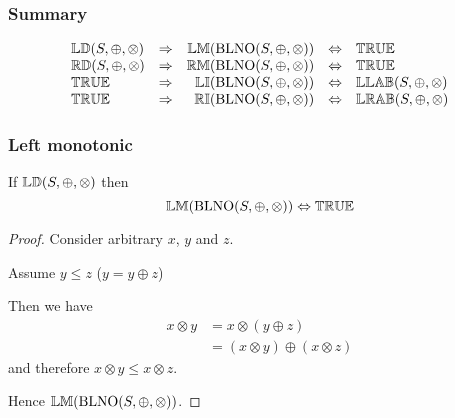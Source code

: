 \documentclass[../Summary.tex]{subfiles}
\begin{document}
\subsubsection{Summary}

\[
\begin{array}{lcrcl} 
\propname{LD}(S, \oplus, \otimes)
	& \Rightarrow
	& \propname{LM}(\mathrm{BLNO}(S,\oplus,\otimes))
    & \Leftrightarrow
    & \propname{TRUE} \\
\propname{RD}(S, \oplus, \otimes)
	& \Rightarrow
	& \propname{RM}(\mathrm{BLNO}(S,\oplus,\otimes))
    & \Leftrightarrow %
    & \propname{TRUE} \\
\propname{TRUE}
	& \Rightarrow
	& \propname{LI}(\mathrm{BLNO}(S,\oplus,\otimes))
    & \Leftrightarrow %
    & \propname{LLAB}(S,\oplus,\otimes) \\ 
\propname{TRUE}
	& \Rightarrow
	& \propname{RI}(\mathrm{BLNO}(S,\oplus,\otimes))
    & \Leftrightarrow %
    & \propname{LRAB}(S,\oplus,\otimes) \\
\end{array} 
\] 




\subsubsection{Left monotonic}

\begin{theorem} \label{thm:blno_left_monotonic}
If ${\mathbb{LD}}(S, \oplus, \otimes)$ then
\begin{equation*}
{\mathbb{LM}}(\mathrm{BLNO}(S,\oplus,\otimes)) \Leftrightarrow {\mathbb{TRUE}}
\end{equation*}
\end{theorem}

\begin{proof}

\vspace{0.5em}
Consider arbitrary $x$, $y$ and $z$.
\begin{ind}
Assume $y \leq z$ ($y = y \oplus z$)
\begin{ind}
Then we have
\begin{align*}
x \otimes y & = x \otimes (y \oplus z) \\
			& = (x \otimes y) \oplus (x \otimes z)
\end{align*}
and therefore $x \otimes y \leq x \otimes z$.
\end{ind}
\end{ind}
Hence ${\mathbb{LM}}(\mathrm{BLNO}(S,\oplus,\otimes))$.
\end{proof}
\end{document}
